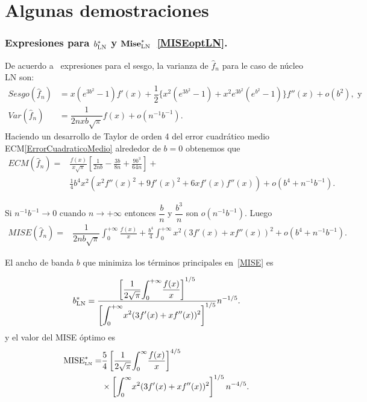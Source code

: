 \chapter{Algunas demostraciones}

\subsection{Expresiones para $b_{\small{\text{LN}}}^*$ y $\textbf{Mise}_{\small{\text{LN}}}^*$~\eqref{MISEoptLN}.}
\label{byMiseOptLN}
\begin{dem}
	De acuerdo a~\cite{Libnegue2013} expresiones para el sesgo, la varianza de $\widehat{f}_n$ para le caso de núcleo LN son:
	\begin{align}
	Sesgo(\widehat{f}_n)&=x(e^{3 b^2}-1) f'(x)+\dfrac{1}{2}\{x^2(e^{3 b^2}-1)+x^2 e^{3b^2}(e^{b^2}-1)\}f''(x)+o(b^2), \text{ y}\\
	Var(\widehat{f}_n)&=\dfrac{1}{2 n x b \sqrt{\pi}} f(x)+o(n^{-1}b^{-1}).
	\end{align}
	Haciendo un desarrollo de Taylor de orden 4 del error cuadrático medio ECM\eqref{ErrorCuadraticoMedio} alrededor de $b=0$ obtenemos que
	\begin{align}
	ECM(\widehat{f}_n)=&\frac{f(x)}{x \sqrt{\pi}}\left[\frac{1}{2 n b}-\frac{3 b}{8 n}+\frac{9 b^3}{64 n}\right]+\\
	&\frac{1}{4} b^4 x^2 \left(x^2 f''(x)^2+9 f'(x)^2+6 x f'(x) f''(x)\right)+o\left(b^4+n^{-1}b^{-1}\right).
	\end{align}
	
	Si $n^{-1}b^{-1} \to 0$ cuando $n \to +\infty$ entonces $\dfrac{b}{n}$ y $\dfrac{b^3}{n}$ son $o(n^{-1}b^{-1})$.
	Luego
	\begin{align}
	\label{MISE:apendice}
	MISE(\widehat{f}_n)=&\dfrac{1}{2 n b \sqrt{\pi}} \int_{0}^{+\infty}\frac{f(x)}{x}+\frac{b^4}{4} \int_{0}^{+\infty} x^2\left(3f'(x)+xf''(x)\right)^2+o\left(b^4+n^{-1}b^{-1}\right).
	\end{align}
	
	El ancho de banda $b$ que minimiza los términos principales en~\ref{MISE} es 
	
	\begin{align}
	b_{\small{\text{LN}}}^*=\dfrac{\left[\dfrac{1}{2\sqrt{\pi}}\displaystyle{\int_0^{+\infty}}\frac{f(x)}{x}\right]^{1/5}}{\left[\displaystyle{\int_0^{+\infty}} x^2(3f'(x)+xf''(x))^2\right]^{1/5}}n^{-1/5}.
	\end{align}
	y el valor del MISE óptimo es
	\begin{align}
	\text{MISE}^*_{\text{\tiny{LN}}}=&\dfrac{5}{4}  \left[\dfrac{1}{2\sqrt{\pi}}\displaystyle{\int_{0}^{\infty}} \frac{f(x)}{x} \right]^{4/5} \\
	&\times \left[\displaystyle{\int_{0}^{\infty}}  x^2 (3 f'(x) + x f''(x))^2 \right]^{1/5} n^{-4/5} .
	\end{align}
\end{dem}


